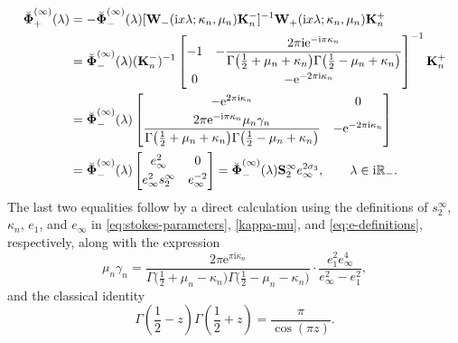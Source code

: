 \documentclass[pdftex]{sigma}
\numberwithin{equation}{section}
\newcommand{\ee}{\mathrm{e}}
\newcommand{\ii}{\mathrm{i}}
\newcommand{\para}[1]{\breve{#1}}
\begin{document}
\begin{align*}
 \para{\boldsymbol{\Phi}}_+^{(\infty)}(\lambda)&=-\para{\boldsymbol{\Phi}}_-^{(\infty)}(\lambda)[\mathbf{W}_{-}(\ii x\lambda;\kappa_n,\mu_n)\mathbf{K}_n^-]^{-1}\mathbf{W}_{+}(\ii x\lambda;\kappa_n,\mu_n)\mathbf{K}_n^+\\
 &=\para{\boldsymbol{\Phi}}_-^{(\infty)}(\lambda)(\mathbf{K}^-_n)^{-1}\begin{bmatrix}
 -1 & \displaystyle -\frac{2\pi \ii\ee^{-\ii\pi\kappa_n}}{\Gamma\big(\frac{1}{2}+\mu_n+\kappa_n\big)\Gamma\big(\frac{1}{2}-\mu_n+\kappa_n\big)}\vspace{1mm}\\
 0 & -\ee^{-2\pi \ii\kappa_n}
 \end{bmatrix}^{-1}\mathbf{K}_n^+\\
 &=\para{\boldsymbol{\Phi}}_-^{(\infty)}(\lambda)\begin{bmatrix}
 -\ee^{2\pi \ii\kappa_n} & 0\vspace{1mm}\\
 \displaystyle \frac{2\pi \ee^{-\ii\pi\kappa_n}\mu_n\gamma_n }{\Gamma\big(\frac{1}{2}+\mu_n+\kappa_n\big)\Gamma\big(\frac{1}{2}-\mu_n+\kappa_n\big)} &-\ee^{-2\pi \ii\kappa_n}
 \end{bmatrix} \\
 &= \para{\boldsymbol{\Phi}}_-^{(\infty)}(\lambda) \begin{bmatrix}e_{\infty}^{2}&0 \vspace{1mm}\\ e_\infty^2s_2^\infty&e_{\infty}^{-2}\end{bmatrix} = \para{\boldsymbol{\Phi}}_-^{(\infty)}(\lambda) \mathbf{S}_2^\infty e_\infty^{2\sigma_3}, \qquad \lambda\in\mathrm{i}\mathbb{R}_-.
\end{align*}
The last two equalities follow by a direct calculation using the definitions of $s_2^\infty$, $\kappa_n$, $e_1$, and $e_\infty$ in \eqref{eq:stokes-parameters}, \eqref{kappa-mu}, and \eqref{eq:e-definitions}, respectively, along with the expression
\begin{equation} \label{Qinfty-gammainfty}
 \mu_n \gamma_n = \dfrac{2\pi \ee^{\pi \ii \kappa_n}}{\Gamma\big( \frac{1}{2} + \mu_n - \kappa_n\big)\Gamma\big( \frac{1}{2} - \mu_n - \kappa_n\big)} \cdot \frac{e_1^2 e_\infty^4}{e_\infty^2 - e_1^2},
\end{equation}
and the classical identity
\begin{equation}
\label{eq:Gamma-reflection}
\Gamma \left(\frac{1}{2} - z \right) \Gamma \left(\frac{1}{2} + z \right) = \dfrac{\pi }{\cos(\pi z)}.
\end{equation}
\end{document}
